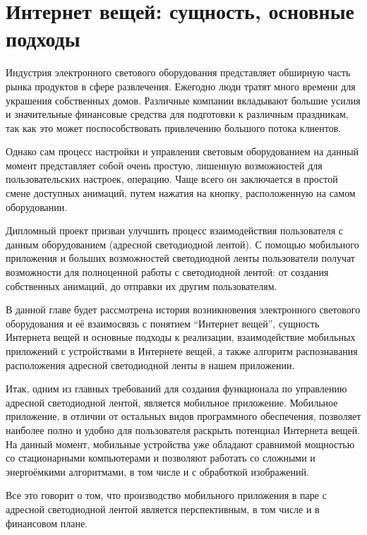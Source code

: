 \section{Интернет вещей: сущность, основные подходы}
\label{sec:subject}

Индустрия электронного светового оборудования представляет обширную часть рынка продуктов в сфере развлечения. Ежегодно люди тратят много времени для украшения собственных домов. Различные компании вкладывают большие усилия и значительные финансовые средства для подготовки к различным праздникам, так как это может поспособствовать привлечению большого потока клиентов.

Однако сам процесс настройки и управления световым оборудованием на данный момент представляет собой очень простую, лишенную возможностей для пользовательских настроек, операцию. Чаще всего он заключается в простой смене доступных анимаций, путем нажатия на кнопку, расположенную на самом оборудовании.

Дипломный проект призван улучшить процесс взаимодействия пользователя с данным оборудованием (адресной светодиодной лентой). С помощью мобильного приложения и больших возможностей светодиодной ленты пользователи получат возможности для полноценной работы с светодиодной лентой: от создания собственных анимаций, до отправки их другим пользователям.

В данной главе будет рассмотрена история возникновения электронного светового оборудования и её взаимосвязь с понятием \enquote{Интернет вещей}, сущность Интернета вещей и основные подходы к реализации, взаимодействие мобильных приложений с устройствами в Интернете вещей, а также алгоритм распознавания расположения адресной светодиодной ленты в нашем приложении.









Итак, одним из главных требований для создания функционала по управлению адресной светодиодной лентой, является мобильное приложение. Мобильное приложение, в отличии от остальных видов программного обеспечения, позволяет наиболее полно и удобно для пользователя раскрыть потенциал Интернета вещей. На данный момент, мобильные устройства уже обладают сравнимой мощностью со стационарными компьютерами и позволяют работать со сложными и энергоёмкими алгоритмами, в том числе и с обработкой изображений.

Все это говорит о том, что производство мобильного приложения в паре с адресной светодиодной лентой является перспективным, в том числе и в финансовом плане.